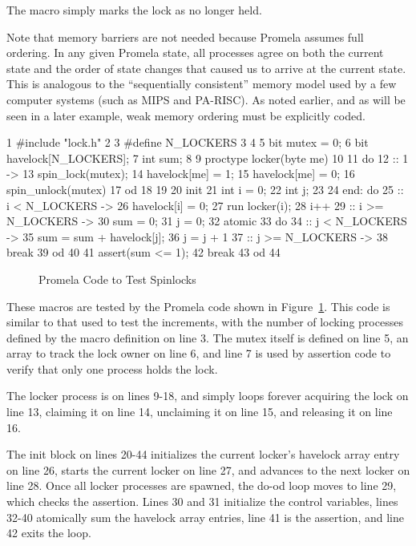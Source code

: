 The  macro simply marks the lock as no
longer held.

Note that memory barriers are not needed because Promela assumes
full ordering.
In any given Promela state, all processes agree on both the current
state and the order of state changes that caused us to arrive at
the current state.
This is analogous to the ``sequentially consistent'' memory model
used by a few computer systems (such as MIPS and PA-RISC).
As noted earlier, and as will be seen in a later example,
weak memory ordering must be explicitly coded.

{ \scriptsize
\begin{verbbox}
  1 #include "lock.h"
  2
  3 #define N_LOCKERS 3
  4
  5 bit mutex = 0;
  6 bit havelock[N_LOCKERS];
  7 int sum;
  8
  9 proctype locker(byte me)
 10 {
 11   do
 12   :: 1 ->
 13     spin_lock(mutex);
 14     havelock[me] = 1;
 15     havelock[me] = 0;
 16     spin_unlock(mutex)
 17   od
 18 }
 19
 20 init {
 21   int i = 0;
 22   int j;
 23
 24 end:  do
 25   :: i < N_LOCKERS ->
 26     havelock[i] = 0;
 27     run locker(i);
 28     i++
 29   :: i >= N_LOCKERS ->
 30     sum = 0;
 31     j = 0;
 32     atomic {
 33       do
 34       :: j < N_LOCKERS ->
 35         sum = sum + havelock[j];
 36         j = j + 1
 37       :: j >= N_LOCKERS ->
 38         break
 39       od
 40     }
 41     assert(sum <= 1);
 42     break
 43   od
 44 }
\end{verbbox}
}
\begin{figure}[htbp]
\centering
\theverbbox
\caption{Promela Code to Test Spinlocks}
\label{fig:analysis:Promela Code to Test Spinlocks}
\end{figure}

These macros are tested by the Promela code shown in
Figure~\ref{fig:analysis:Promela Code to Test Spinlocks}.
This code is similar to that used to test the increments,
with the number of locking processes defined by the 
macro definition on line 3.
The mutex itself is defined on line 5, an array to track the lock owner
on line 6, and line 7 is used by assertion
code to verify that only one process holds the lock.

The locker process is on lines 9-18, and simply loops forever
acquiring the lock on line 13, claiming it on line 14,
unclaiming it on line 15, and releasing it on line 16.

The init block on lines 20-44 initializes the current locker's
havelock array entry on line 26, starts the current locker on
line 27, and advances to the next locker on line 28.
Once all locker processes are spawned, the do-od loop
moves to line 29, which checks the assertion.
Lines 30 and 31 initialize the control variables,
lines 32-40 atomically sum the havelock array entries,
line 41 is the assertion, and line 42 exits the loop.


